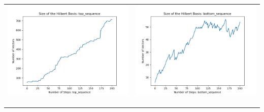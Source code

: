 \documentclass[10pt]{article}
\begin{document}
\begin{tabular}{c|c}
\begin{minipage}{.45\textwidth}
\includegraphics[width=\textwidth]{"DATA/5d/5 generators 2 bound I/top_sequence SIZE"}
\end{minipage} &
\begin{minipage}{.45\textwidth}
\includegraphics[width=\textwidth]{"DATA/5d/5 generators 2 bound I bottomup/bottom_sequence SIZE"}
\end{minipage} \\ \\
\hline \\\begin{minipage}{.45\textwidth}

\end{minipage}
\end{tabular}
\end{document}
